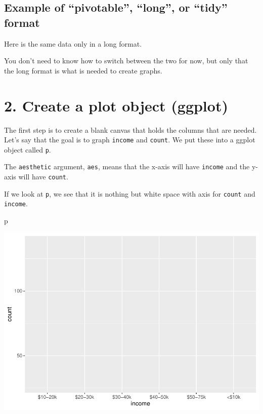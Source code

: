 \documentclass[]{book}
\newenvironment{Shaded}{\begin{snugshade}}{\end{snugshade}}
\newcommand{\DataTypeTok}[1]{\textcolor[rgb]{0.13,0.29,0.53}{#1}}
\newcommand{\KeywordTok}[1]{\textcolor[rgb]{0.13,0.29,0.53}{\textbf{#1}}}
\newcommand{\NormalTok}[1]{#1}
\newcommand{\OperatorTok}[1]{\textcolor[rgb]{0.81,0.36,0.00}{\textbf{#1}}}
\newcommand{\StringTok}[1]{\textcolor[rgb]{0.31,0.60,0.02}{#1}}
\begin{document}
\hypertarget{example-of-pivotable-long-or-tidy-format}{%
\section{Example of ``pivotable'', ``long'', or ``tidy'' format}\label{example-of-pivotable-long-or-tidy-format}}

Here is the same data only in a long format.

You don't need to know how to switch between the two for now, but only that the long format is what is needed to create graphs.

\hypertarget{create-a-plot-object-ggplot}{%
\chapter{2. Create a plot object (ggplot)}\label{create-a-plot-object-ggplot}}

The first step is to create a blank canvas that holds the columns that are needed. Let's say that the goal is to graph \texttt{income} and \texttt{count}. We put these into a ggplot object called \texttt{p}.

The \texttt{aesthetic} argument, \texttt{aes}, means that the x-axis will have \texttt{income} and the y-axis will have \texttt{count}.

\begin{Shaded}
\end{Shaded}

If we look at \texttt{p}, we see that it is nothing but white space with axis for \texttt{count} and \texttt{income}.

\begin{Shaded}
\begin{Highlighting}[]
\NormalTok{p}
\end{Highlighting}
\end{Shaded}

\includegraphics{bookdown-demo_files/figure-latex/unnamed-chunk-12-1.pdf}
\end{document}
